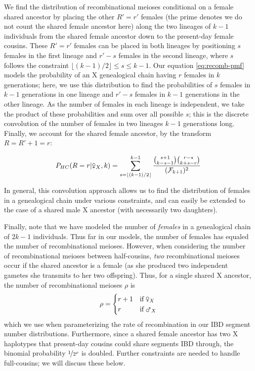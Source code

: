 \documentclass[11pt]{article}
\newcommand{\msxa}{\mars_X}
\newcommand{\fsxa}{\venus_X}
\begin{document}
We find the distribution of recombinational meioses conditional on a female
shared ancestor by placing the other $R'=r'$ females (the prime denotes we do
not count the shared female ancestor here) along the two lineages of $k-1$
individuals from the shared female ancestor down to the present-day female
cousins. These $R'=r'$ females can be placed in both lineages by positioning
$s$ females in the first lineage and $r'-s$ females in the second lineage,
where $s$ follows the constraint $\lfloor (k-1)/2 \rfloor \le s \le k-1$.
Our equation \eqref{eq:recomb-pmf} models the probability of an X genealogical
chain having $r$ females in $k$ generations; here, we use this distribution to
find the probabilities of $s$ females in $k-1$ generations in one lineage and
$r'-s$ females in $k-1$ generations in the other lineage. As the number of
females in each lineage is independent, we take the product of these
probabilities and sum over all possible $s$; this is the discrete convolution
of the number of females in two lineages $k-1$ generations long.  Finally, we
account for the shared female ancestor, by the transform $R = R' + 1 = r$:

\begin{equation}
  \label{eq:prob-r-given-female}
  P_{HC}(R=r | \fsxa, k) = \sum_{s=\lfloor (k-1)/2 \rfloor}^{k-1} \frac{ {s + 1 \choose k - s - 1 } { r - s \choose k + s - r } }{(\mathcal{F}_{k+1})^2}
\end{equation}

In general, this convolution approach allows us to find the distribution of
females in a genealogical chain under various constraints, and can easily be
extended to the case of a shared male X ancestor (with necessarily two
daughters).
 
Finally, note that we have modeled the number of \emph{females} in a
genealogical chain of $2k-1$ individuals. Thus far in our models, the number of
females has equaled the number of recombinational meioses. However, when
considering the number of recombinational meioses between half-cousins,
\emph{two} recombinational meioses occur if the shared ancestor is a female (as
she produced two independent gametes she transmits to her two offspring). Thus,
for a single shared X ancestor, the number of recombinational meioses $\rho$ is
%
\begin{equation}
  \rho = \begin{cases}
        r + 1 & \text{if} \; \fsxa\\
        r & \text{if} \; \msxa\\
      \end{cases}
\label{eq:recomb-total}
\end{equation}
%
which we use when parameterizing the rate of recombination in our IBD segment
number distributions. Furthermore, since a shared female ancestor has two X
haplotypes that present-day cousins could share segments IBD through, the
binomial probability $\nicefrac{1}{2^\rho}$ is doubled. Further constraints are
needed to handle full-cousins; we will discuss these below.
\end{document}
